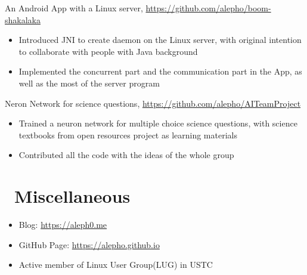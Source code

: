 \documentclass{resume}
\begin{document}
An Android App with a Linux server, \href{https://github.com/alepho/boom-shakalaka}{https://github.com/alepho/boom-shakalaka}
\begin{itemize}
  \item Introduced JNI to create daemon on the Linux server, with original intention to collaborate with people with Java background
  \item Implemented the concurrent part and the communication part in the App, as well as the most of the server program
\end{itemize}

Neron Network for science questions, \href{https://github.com/alepho/AITeamProject}{https://github.com/alepho/AITeamProject}
\begin{itemize}
  \item Trained a neuron network for multiple choice science questions, with science textbooks from open resources project as learning materials
  \item Contributed all the code with the ideas of the whole group
\end{itemize}



\section{\texorpdfstring{\faInfo}\ \ Miscellaneous}
\begin{itemize}[parsep=0.5ex]
  \item Blog: \href{https://aleph0.me}{https://aleph0.me}
  \item GitHub Page: \href{https://alepho.github.io}{https://alepho.github.io}
  \item Active member of Linux User Group(LUG) in USTC
\end{itemize}

%
%
\end{document}

